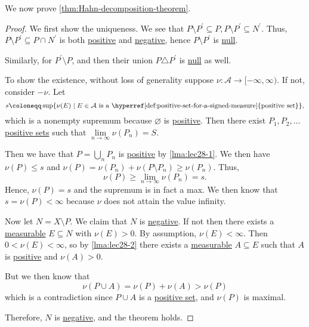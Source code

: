 We now prove \autoref{thm:Hahn-decomposition-theorem}.
\begin{proof}
  We first show the uniqueness. We see that \(P \setminus P^\prime \subseteq P, P \setminus P^\prime  \subseteq N^\prime \). Thus, \(P \setminus P^\prime  \subseteq P \cap N^\prime \)
  is both \hyperref[def:positive-set-for-a-signed-measure]{positive} and \hyperref[def:negative-set-for-a-signed-measure]{negative}, hence \(P \setminus P^\prime\) is \hyperref[def:null-set-for-a-signed-measure]{null}.

  Similarly, for \(P^\prime \setminus P\), and then their union \(P \triangle P^\prime\) is \hyperref[def:null-set-for-a-signed-measure]{null} as well.

  \par To show the existence, without loss of generality suppose \(\nu \colon \mathcal{A} \to [-\infty,\infty)\). If not, consider \(-\nu\). Let
  \[
    s \coloneqq \sup\{\nu(E) \mid E \in \mathcal{A} \text{ is a \hyperref[def:positive-set-for-a-signed-measure]{positive set}}\},
  \]
  which is a nonempty supremum because \(\varnothing\) is \hyperref[def:positive-set-for-a-signed-measure]{positive}. Then there exist
  \(P_1,P_2,\ldots\) \hyperref[def:positive-set-for-a-signed-measure]{positive sets} such that \(\lim\limits_{n\to \infty } \nu(P_n) = S\).

  Then we have that \(P = \bigcup_n P_n\) is \hyperref[def:positive-set-for-a-signed-measure]{positive} by \autoref{lma:lec28-1}.
  We then have \(\nu(P) \leq s\) and \(\nu(P) = \nu(P_n) + \nu(P \setminus P_n) \geq \nu(P_n)\). Thus,
  \[
    \nu(P) \geq \lim_{n \to \infty} \nu(P_n) = s.
  \]
  Hence, \(\nu(P) = s\) and the supremum is in fact a max. We then know that \(s = \nu(P) < \infty\) because \(\nu\) does not attain the value infinity.

  Now let \(N = X \setminus P\). We claim that \(N\) is \hyperref[def:negative-set-for-a-signed-measure]{negative}. If not then there exists a
  \hyperref[def:measurable-set]{measurable} \(E \subseteq N\) with \(\nu(E) > 0\).
  By assumption, \(\nu(E) < \infty\). Then \(0 < \nu(E) < \infty\), so by \autoref{lma:lec28-2} there exists a \hyperref[def:measurable-set]{measurable}
  \(A \subseteq E\) such that \(A\) is \hyperref[def:positive-set-for-a-signed-measure]{positive} and \(\nu(A) > 0\).

  But we then know that
  \[
    \nu(P \cup A) = \nu(P) + \nu(A) > \nu(P)
  \]
  which is a contradiction since \(P \cup A\) is a \hyperref[def:positive-set-for-a-signed-measure]{positive set}, and \(\nu(P)\) is maximal.

  Therefore, \(N\) is \hyperref[def:negative-set-for-a-signed-measure]{negative}, and the theorem holds.
\end{proof}


